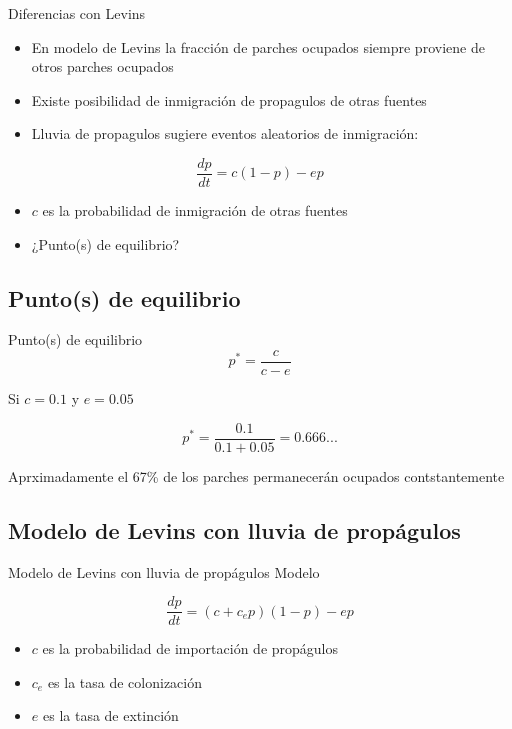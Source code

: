 \documentclass[
  11pt,
  ignorenonframetext,
]{beamer}
\begin{document}
\begin{frame}{Diferencias con Levins}
\begin{itemize}
\item
  En modelo de Levins la fracción de parches ocupados siempre proviene
  de otros parches ocupados
\item
  Existe posibilidad de inmigración de propagulos de otras fuentes
\item
  Lluvia de propagulos sugiere eventos aleatorios de inmigración:
\end{itemize}

\[\frac{dp}{dt} = c (1-p) - ep\]

\begin{itemize}
\item
  \(c\) es la probabilidad de inmigración de otras fuentes
\item
  ¿Punto(s) de equilibrio?
\end{itemize}
\end{frame}

\hypertarget{puntos-de-equilibrio-1}{%
\subsection{Punto(s) de equilibrio}\label{puntos-de-equilibrio-1}}

\begin{frame}{Punto(s) de equilibrio}
\[p^* = \frac{c}{c-e}\]

Si \(c = 0.1\) y \(e = 0.05\)

\[p^* = \frac{0.1}{0.1+0.05} = 0.666...\]

Aprximadamente el 67\% de los parches permanecerán ocupados
contstantemente
\end{frame}

\hypertarget{modelo-de-levins-con-lluvia-de-propuxe1gulos}{%
\subsection{Modelo de Levins con lluvia de
propágulos}\label{modelo-de-levins-con-lluvia-de-propuxe1gulos}}

\begin{frame}{Modelo de Levins con lluvia de propágulos}
Modelo

\[\frac{dp}{dt} = (c + c_e p)(1-p) - ep\]

\begin{itemize}
\item
  \(c\) es la probabilidad de importación de propágulos
\item
  \(c_e\) es la tasa de colonización
\item
  \(e\) es la tasa de extinción
\end{itemize}
\end{frame}
\end{document}
